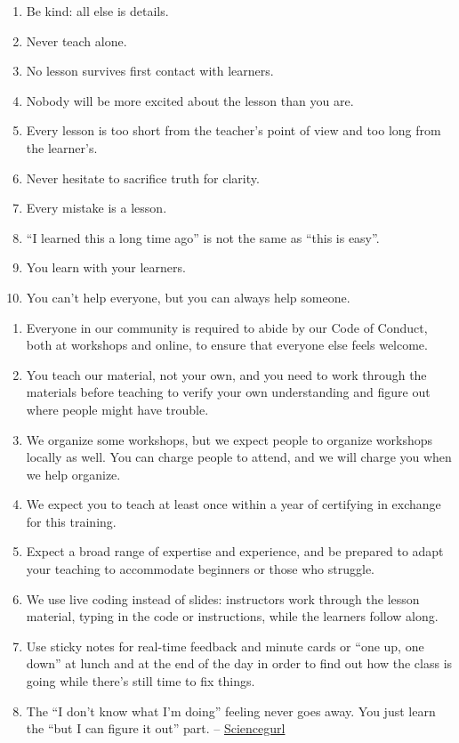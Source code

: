 

\begin{enumerate}
\item
  Be kind: all else is details.
\item
  Never teach alone.
\item
  No lesson survives first contact with learners.
\item
  Nobody will be more excited about the lesson than you are.
\item
  Every lesson is too short from the teacher's point of view and too
  long from the learner's.
\item
  Never hesitate to sacrifice truth for clarity.
\item
  Every mistake is a lesson.
\item
  ``I learned this a long time ago'' is not the same as ``this is
  easy''.
\item
  You learn with your learners.
\item
  You can't help everyone, but you can always help someone.
\end{enumerate}


\begin{enumerate}
\item
  Everyone in our community is required to abide by our
  Code of Conduct, both
  at workshops and online, to ensure that everyone else feels welcome.
\item
  You teach our material, not your own, and you need to work through the
  materials before teaching to verify your own understanding and figure
  out where people might have trouble.
\item
  We organize some workshops, but we expect people to organize workshops
  locally as well. You can charge people to attend, and we will charge
  you when we help organize.
\item
  We expect you to teach at least once within a year of certifying in
  exchange for this training.
\item
  Expect a broad range of expertise and experience, and be prepared to
  adapt your teaching to accommodate beginners or those who struggle.
\item
  We use live coding instead of slides: instructors work through the
  lesson material, typing in the code or instructions, while the
  learners follow along.
\item
  Use sticky notes for real-time feedback and minute cards or ``one up,
  one down'' at lunch and at the end of the day in order to find out how
  the class is going while there's still time to fix things.
\item
  The ``I don't know what I'm doing'' feeling never goes away. You just
  learn the ``but I can figure it out'' part. --
  \href{https://twitter.com/sciencegurlz0/status/687739023826235393}{Sciencegurl}
\end{enumerate}

